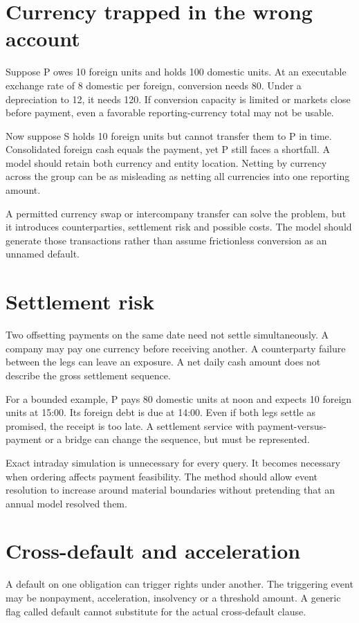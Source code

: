 \section{Currency trapped in the wrong account}
Suppose P owes 10 foreign units and holds 100 domestic units. At an executable exchange rate of 8 domestic per foreign, conversion needs 80. Under a depreciation to 12, it needs 120. If conversion capacity is limited or markets close before payment, even a favorable reporting-currency total may not be usable.

Now suppose S holds 10 foreign units but cannot transfer them to P in time. Consolidated foreign cash equals the payment, yet P still faces a shortfall. A model should retain both currency and entity location. Netting by currency across the group can be as misleading as netting all currencies into one reporting amount.

A permitted currency swap or intercompany transfer can solve the problem, but it introduces counterparties, settlement risk and possible costs. The model should generate those transactions rather than assume frictionless conversion as an unnamed default.

\section{Settlement risk}
Two offsetting payments on the same date need not settle simultaneously. A company may pay one currency before receiving another. A counterparty failure between the legs can leave an exposure. A net daily cash amount does not describe the gross settlement sequence.

For a bounded example, P pays 80 domestic units at noon and expects 10 foreign units at 15:00. Its foreign debt is due at 14:00. Even if both legs settle as promised, the receipt is too late. A settlement service with payment-versus-payment or a bridge can change the sequence, but must be represented.

Exact intraday simulation is unnecessary for every query. It becomes necessary when ordering affects payment feasibility. The method should allow event resolution to increase around material boundaries without pretending that an annual model resolved them.

\section{Cross-default and acceleration}
A default on one obligation can trigger rights under another. The triggering event may be nonpayment, acceleration, insolvency or a threshold amount. A generic flag called default cannot substitute for the actual cross-default clause.

